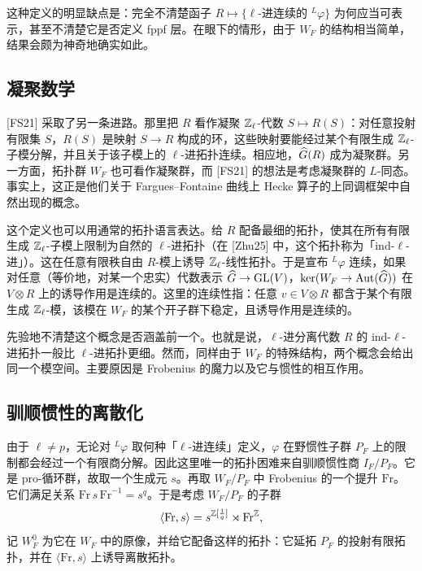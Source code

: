 这种定义的明显缺点是：完全不清楚函子 $R\mapsto\{\ell\text{-进连续的 }{}^{L}\varphi\}$ 为何应当可表示，甚至不清楚它是否定义 fppf 层。在眼下的情形，由于 $W_F$ 的结构相当简单，结果会颇为神奇地确实如此。

\subsection{凝聚数学}

[FS21] 采取了另一条进路。那里把 $R$ 看作凝聚 $\mathbb{Z}_\ell$-代数 $S\mapsto R(S)$：对任意投射有限集 $S$，$R(S)$ 是映射 $S\to R$ 构成的环，这些映射要能经过某个有限生成 $\mathbb{Z}_\ell$-子模分解，并且关于该子模上的 $\ell$-进拓扑连续。相应地，$\widehat{G}(R)$ 成为凝聚群。另一方面，拓扑群 $W_F$ 也可看作凝聚群，而 [FS21] 的想法是考虑凝聚群的 $L$-同态。事实上，这正是他们关于 Fargues–Fontaine 曲线上 Hecke 算子的上同调框架中自然出现的概念。

这个定义也可以用通常的拓扑语言表达。给 $R$ 配备最细的拓扑，使其在所有有限生成 $\mathbb{Z}_\ell$-子模上限制为自然的 $\ell$-进拓扑（在 [Zhu25] 中，这个拓扑称为「ind-$\ell$-进」）。这在任意有限秩自由 $R$-模上诱导 $\mathbb{Z}_\ell$-线性拓扑。于是宣布 ${}^L\varphi$ 连续，如果对任意（等价地，对某一个忠实）代数表示 $\widehat{G}\to\mathrm{GL}(V)$，$\ker(W_F\to\operatorname{Aut}(\widehat{G}))$ 在 $V\otimes R$ 上的诱导作用是连续的。这里的连续性指：任意 $v\in V\otimes R$ 都含于某个有限生成 $\mathbb{Z}_\ell$-模，该模在 $W_F$ 的某个开子群下稳定，且诱导作用是连续的。

先验地不清楚这个概念是否涵盖前一个。也就是说，$\ell$-进分离代数 $R$ 的 ind-$\ell$-进拓扑一般比 $\ell$-进拓扑更细。然而，同样由于 $W_F$ 的特殊结构，两个概念会给出同一个模空间。主要原因是 Frobenius 的魔力以及它与惯性的相互作用。

\subsection{驯顺惯性的离散化}

由于 $\ell\ne p$，无论对 ${}^L\varphi$ 取何种「$\ell$-进连续」定义，$\varphi$ 在野惯性子群 $P_F$ 上的限制都会经过一个有限商分解。因此这里唯一的拓扑困难来自驯顺惯性商 $I_F/P_F$。它是 pro-循环群，故取一个生成元 $s$。再取 $W_F/P_F$ 中 Frobenius 的一个提升 $\mathrm{Fr}$。它们满足关系 $\mathrm{Fr}\,s\,\mathrm{Fr}^{-1}=s^q$。于是考虑 $W_F/P_F$ 的子群
\[
\langle\mathrm{Fr},s\rangle=s^{\mathbb{Z}[\frac1q]}\rtimes\mathrm{Fr}^{\mathbb{Z}},
\]
记 $W^0_F$ 为它在 $W_F$ 中的原像，并给它配备这样的拓扑：它延拓 $P_F$ 的投射有限拓扑，并在 $\langle\mathrm{Fr},s\rangle$ 上诱导离散拓扑。

